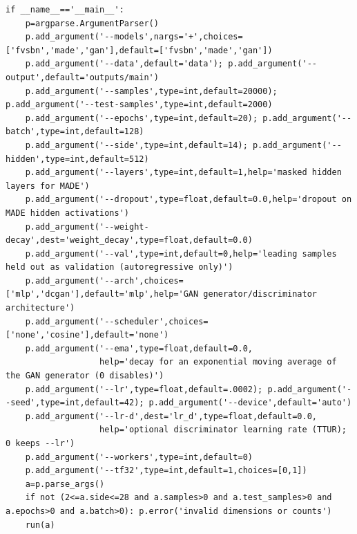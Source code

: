 \begin{lstlisting}
if __name__=='__main__':
    p=argparse.ArgumentParser()
    p.add_argument('--models',nargs='+',choices=['fvsbn','made','gan'],default=['fvsbn','made','gan'])
    p.add_argument('--data',default='data'); p.add_argument('--output',default='outputs/main')
    p.add_argument('--samples',type=int,default=20000); p.add_argument('--test-samples',type=int,default=2000)
    p.add_argument('--epochs',type=int,default=20); p.add_argument('--batch',type=int,default=128)
    p.add_argument('--side',type=int,default=14); p.add_argument('--hidden',type=int,default=512)
    p.add_argument('--layers',type=int,default=1,help='masked hidden layers for MADE')
    p.add_argument('--dropout',type=float,default=0.0,help='dropout on MADE hidden activations')
    p.add_argument('--weight-decay',dest='weight_decay',type=float,default=0.0)
    p.add_argument('--val',type=int,default=0,help='leading samples held out as validation (autoregressive only)')
    p.add_argument('--arch',choices=['mlp','dcgan'],default='mlp',help='GAN generator/discriminator architecture')
    p.add_argument('--scheduler',choices=['none','cosine'],default='none')
    p.add_argument('--ema',type=float,default=0.0,
                   help='decay for an exponential moving average of the GAN generator (0 disables)')
    p.add_argument('--lr',type=float,default=.0002); p.add_argument('--seed',type=int,default=42); p.add_argument('--device',default='auto')
    p.add_argument('--lr-d',dest='lr_d',type=float,default=0.0,
                   help='optional discriminator learning rate (TTUR); 0 keeps --lr')
    p.add_argument('--workers',type=int,default=0)
    p.add_argument('--tf32',type=int,default=1,choices=[0,1])
    a=p.parse_args()
    if not (2<=a.side<=28 and a.samples>0 and a.test_samples>0 and a.epochs>0 and a.batch>0): p.error('invalid dimensions or counts')
    run(a)
\end{lstlisting}

